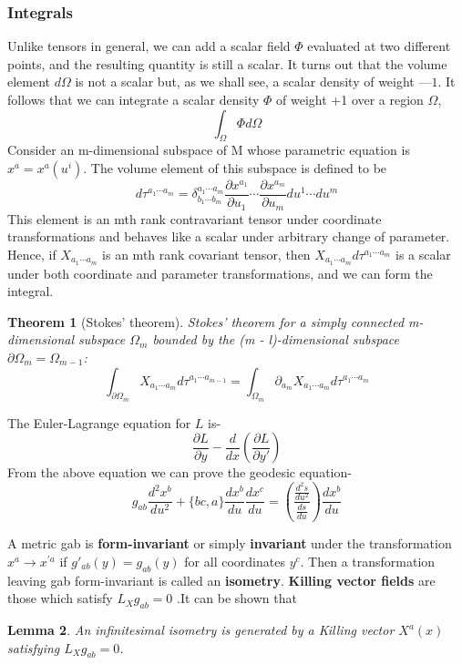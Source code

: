 \documentclass[12pt,a4paper]{article}
\numberwithin{table}{section}
\numberwithin{figure}{section}
\numberwithin{equation}{section}
\newtheorem{theorem}{Theorem}[section]
\newtheorem{lemma}[theorem]{Lemma}
\theoremstyle{remark}
\theoremstyle{definition}
\begin{document}
\subsubsection*{Integrals}
Unlike tensors in general, we can add a scalar field $\Phi$ evaluated at two 
different points,  and the resulting quantity is still a scalar. It turns out that the volume element $d\Omega$ is not a scalar but, as we shall see, a scalar density of weight $—1$. It follows that we can integrate a scalar density $\Phi$ of weight +1 over a region $\Omega$, 
$$\int_{\Omega}\Phi d\Omega $$
Consider an m-dimensional subspace of M whose parametric equation is $x^a=x^a(u^i)$. The volume element of this subspace is defined to be
$$d\tau^{a_1\cdots a_m}=\delta^{a_1\cdots a_m}_{b_1\cdots b_m}\dfrac{\partial x^{a_1}}{\partial u_1}\cdots\dfrac{\partial x^{a_m}}{\partial u_m}du^1\cdots du^m $$
This element is an mth rank contravariant tensor under coordinate  
transformations and behaves like a scalar under arbitrary change of parameter. 
Hence, if $X_{a_1\cdots a_m}$ is an mth rank covariant tensor, then $X_{a_1\cdots a_m}d\tau^{a_1\cdots a_m}$ is a scalar under both coordinate and parameter transformations, and we can form the integral.

\begin{theorem}[Stokes' theorem]
Stokes' theorem for a simply connected m-dimensional subspace $\Omega_m$ bounded by the (m - l)-dimensional subspace $\partial\Omega_m=\Omega_{m-1}$:
$$\int_{\partial\Omega_m}X_{a_1\cdots a_m}d\tau^{a_1\cdots a_{m-1}}=\int_{\Omega_m}\partial_{a_m} X_{a_1\cdots a_m}d\tau^{a_1\cdots a_m}$$

\end{theorem}
The Euler-Lagrange equation for $L$ is-
$$\dfrac{\partial L}{\partial y}-\dfrac{d}{dx}\left(\dfrac{\partial L}{\partial y'}\right) $$
From the above equation we can prove the geodesic equation-
$$g_{ab}\dfrac{d^2x^b}{du^2}+\{bc,a\}\dfrac{dx^b}{du}\dfrac{dx^c}{du}=\left(\dfrac{\frac{d^2s}{du^2}}{\frac{ds}{du}}\right)\dfrac{dx^b}{du} $$

A metric gab is \textbf{form-invariant} or simply \textbf{invariant} under the
transformation $x^a\rightarrow x^{'a}$ if $g'_{ab}(y)=g_{ab}(y)$ for all coordinates $y^c$. Then a transformation leaving gab form-invariant is called an \textbf{isometry}. \textbf{Killing vector fields} are those which satisfy $L_{X}g_{ab}=0$ .It can be shown that
\begin{lemma}An infinitesimal isometry is generated by a Killing vector $X^a(x)$ satisfying $L_{X}g_{ab}=0$.
\end{lemma}
\end{document}
